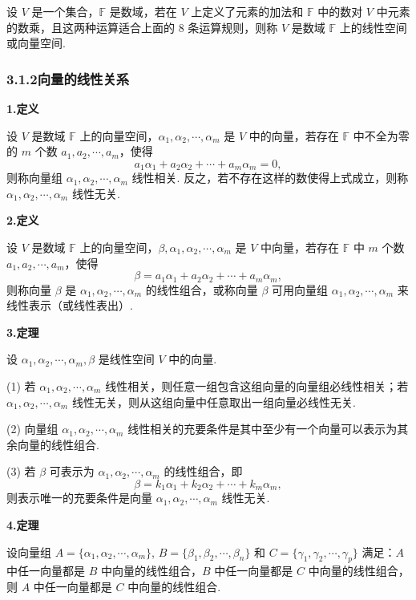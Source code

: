 \documentclass[UTF8, 12pt, fontset=fandol, oneside]{ctexart}
\begin{document}
设 $V$ 是一个集合，$\mathbb{F}$ 是数域，若在 $V$ 上定义了元素的加法和 $\mathbb{F}$ 中的数对 $V$ 中元素的数乘，且这两种运算适合上面的 8 条运算规则，则称 $V$ 是数域 $\mathbb{F}$ 上的线性空间或向量空间.

\subsubsection*{3.1.2\quad 向量的线性关系}

\noindent\textbf{1.\quad 定义}

设 $V$ 是数域 $\mathbb{F}$ 上的向量空间，$\alpha_1,\alpha_2,\cdots,\alpha_m$ 是 $V$ 中的向量，若存在 $\mathbb{F}$ 中不全为零的 $m$ 个数 $a_1,a_2,\cdots,a_m$，使得
\[
a_1\alpha_1+a_2\alpha_2+\cdots+a_m\alpha_m=0,
\]
则称向量组 $\alpha_1,\alpha_2,\cdots,\alpha_m$ 线性相关. 反之，若不存在这样的数使得上式成立，则称 $\alpha_1,\alpha_2,\cdots,\alpha_m$ 线性无关.

\noindent\textbf{2.\quad 定义}

设 $V$ 是数域 $\mathbb{F}$ 上的向量空间，$\beta,\alpha_1,\alpha_2,\cdots,\alpha_m$ 是 $V$ 中向量，若存在 $\mathbb{F}$ 中 $m$ 个数 $a_1,a_2,\cdots,a_m$，使得
\[
\beta=a_1\alpha_1+a_2\alpha_2+\cdots+a_m\alpha_m,
\]
则称向量 $\beta$ 是 $\alpha_1,\alpha_2,\cdots,\alpha_m$ 的线性组合，或称向量 $\beta$ 可用向量组 $\alpha_1,\alpha_2,\cdots,\alpha_m$ 来线性表示（或线性表出）.

\noindent\textbf{3.\quad 定理}

设 $\alpha_1,\alpha_2,\cdots,\alpha_m,\beta$ 是线性空间 $V$ 中的向量.

(1) 若 $\alpha_1,\alpha_2,\cdots,\alpha_m$ 线性相关，则任意一组包含这组向量的向量组必线性相关；若 $\alpha_1,\alpha_2,\cdots,\alpha_m$ 线性无关，则从这组向量中任意取出一组向量必线性无关.

(2) 向量组 $\alpha_1,\alpha_2,\cdots,\alpha_m$ 线性相关的充要条件是其中至少有一个向量可以表示为其余向量的线性组合.

(3) 若 $\beta$ 可表示为 $\alpha_1,\alpha_2,\cdots,\alpha_m$ 的线性组合，即
\[
\beta=k_1\alpha_1+k_2\alpha_2+\cdots+k_m\alpha_m,
\]
则表示唯一的充要条件是向量 $\alpha_1,\alpha_2,\cdots,\alpha_m$ 线性无关.

\noindent\textbf{4.\quad 定理}

设向量组 $A=\{\alpha_1,\alpha_2,\cdots,\alpha_m\}$, $B=\{\beta_1,\beta_2,\cdots,\beta_n\}$ 和 $C=\{\gamma_1,\gamma_2,\cdots,\gamma_p\}$ 满足：$A$ 中任一向量都是 $B$ 中向量的线性组合，$B$ 中任一向量都是 $C$ 中向量的线性组合，则 $A$ 中任一向量都是 $C$ 中向量的线性组合.
\end{document}
